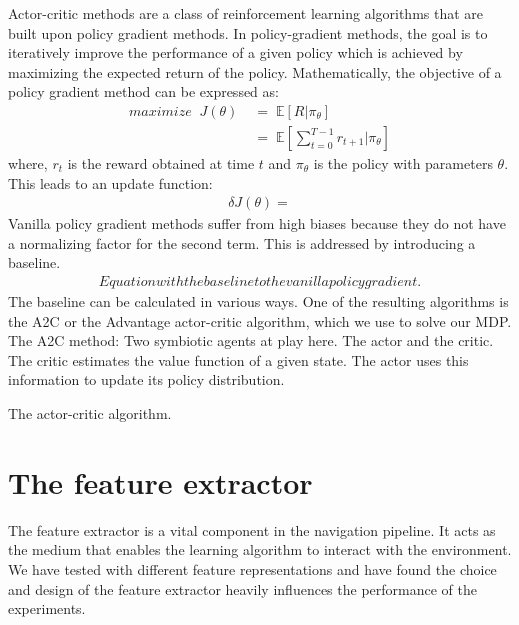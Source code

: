 Actor-critic methods are a class of reinforcement learning algorithms that are built upon policy gradient methods. 
In policy-gradient methods, the goal is to iteratively improve the performance of a given policy which is achieved by maximizing the expected return of the policy. Mathematically, the objective of a policy gradient method can be expressed as:
\begin{align}
maximize \;\; J( \theta )  &\; = \; \mathbb{E} [ R | \pi_{\theta} ] \\
					   & \; = \; \mathbb{E}[ \sum^{T-1}_{t=0} r_{t+1}| \pi_{\theta}] 
\end{align}
where, $r_{t}$ is the reward obtained at time $t$ and $\pi_{\theta}$ is the policy with parameters $\theta$.\\
This leads to an update function:
\begin{align}
\delta J ( \theta ) = 
\end{align} 
Vanilla policy gradient methods suffer from high biases because they do not have a normalizing factor for the second term. This is addressed by introducing a 
baseline. 
\begin{align}
Equation with the baseline to the vanilla policy gradient.
\end{align}
The baseline can be calculated in various ways. One of the resulting algorithms is the A2C or the Advantage actor-critic algorithm, which we use to solve our MDP.
The A2C method:
Two symbiotic agents at play here. The actor and the critic. 
The critic estimates the value function of a given state.
The actor uses this information to update its policy distribution.
\begin{algorithm}
	The actor-critic algorithm.
\end{algorithm}


\section*{The feature extractor}
The feature extractor is a vital component in the navigation pipeline. It acts as the medium that enables the learning algorithm  to interact with the environment. We have tested with different feature representations and have found the choice and design of the feature extractor heavily influences the performance of the experiments.\\

